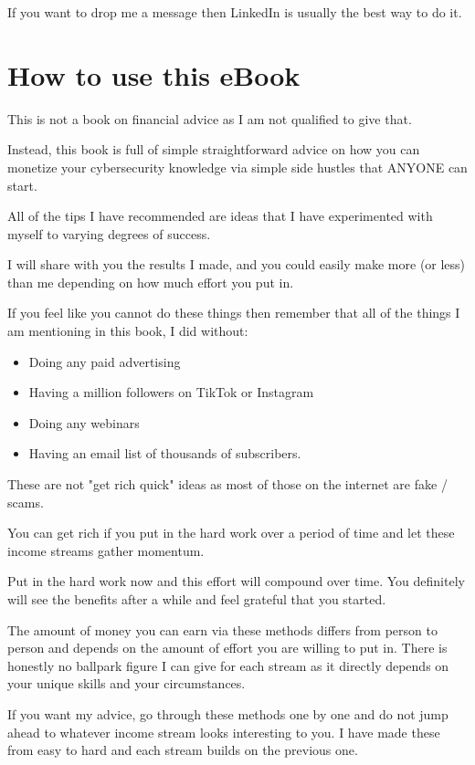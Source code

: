 \documentclass[11pt]{article}
\begin{document}
If you want to drop me a message then LinkedIn is usually the best way to do it.

\section*{How to use this eBook}
This is not a book on financial advice as I am not qualified to give that.

Instead, this book is full of simple straightforward advice on how you can monetize your cybersecurity knowledge via simple side hustles that ANYONE can start.

All of the tips I have recommended are ideas that I have experimented with myself to varying degrees of success.

I will share with you the results I made, and you could easily make more (or less) than me depending on how much effort you put in.

If you feel like you cannot do these things then remember that all of the things I am mentioning in this book, I did without:

\begin{itemize}
\item Doing any paid advertising
\item Having a million followers on TikTok or Instagram
\item Doing any webinars
\item Having an email list of thousands of subscribers.
\end{itemize}

These are not "get rich quick" ideas as most of those on the internet are fake / scams.

You can get rich if you put in the hard work over a period of time and let these income streams gather momentum.

Put in the hard work now and this effort will compound over time. You definitely will see the benefits after a while and feel grateful that you started.

The amount of money you can earn via these methods differs from person to person and depends on the amount of effort you are willing to put in. There is honestly no ballpark figure I can give for each stream as it directly depends on your unique skills and your circumstances.

If you want my advice, go through these methods one by one and do not jump ahead to whatever income stream looks interesting to you. I have made these from easy to hard and each stream builds on the previous one.
\end{document}
